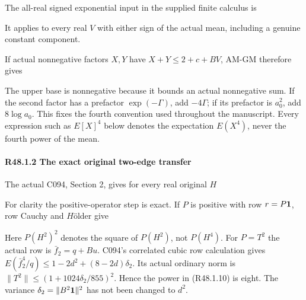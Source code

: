 The all-real signed exponential input in the supplied finite calculus is


It applies to every real \(V\) with either sign of the actual mean, including a genuine constant component. 

If actual nonnegative factors \(X,\allowbreak \allowbreak Y\) have \(X+Y \le  2+c+BV\), AM-GM therefore gives


The upper base is nonnegative because it bounds an actual nonnegative sum. If the second factor has a prefactor \(\exp(-\Gamma)\), add \(-4 \Gamma\); if its prefactor is \(a_0^2\), add \(8 \log a_0\). This fixes the fourth convention used throughout the manuscript. Every expression such as \(E[X]^4\) below denotes the expectation \(E(X^4)\), never the fourth power of the mean.

\paragraph{R48.1.2 The exact original two-edge transfer}

The actual C094, Section 2, gives for every real original \(H\)


For clarity the positive-operator step is exact. If \(P\) is positive with row \(r = P\mathbf1\), row Cauchy and \(H\)ölder give


Here \(P(H^2)^2\) denotes the square of \(P(H^2)\), not \(P(H^4)\). For \(P=T^2\) the actual row is \(\bar f_{2}=q+Bu\). C094's correlated cubic row calculation gives \(E(\bar f_{2}^4/q) \le  1-2d^2+(8-2d)\delta_2\). Its actual ordinary norm is \(\lVert T^2\rVert  \le  (1+1024 \delta_2/855)^2\). Hence the power in (R48.1.10) is eight. The variance \(\delta_2 = \lVert B^2\mathbf1\rVert ^2\) has not been changed to \(d^2\).

